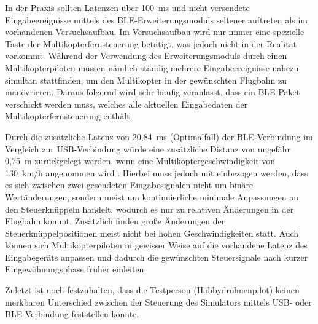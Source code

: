 In der Praxis sollten Latenzen über 100~ms und nicht versendete Eingabeereignisse mittels des \ac{BLE}-Erweiterungsmoduls seltener auftreten als im vorhandenen Versuchsaufbau. Im Versuchsaufbau wird nur immer eine spezielle Taste der Multikopterfernsteuerung betätigt, was jedoch nicht in der Realität vorkommt. Während der Verwendung des Erweiterungsmoduls durch einen Multikopterpiloten müssen nämlich ständig mehrere Eingabeereignisse nahezu simultan stattfinden, um den Multikopter in der gewünschten Flugbahn zu manövrieren. Daraus folgernd wird sehr häufig veranlasst, dass ein \ac{BLE}-Paket verschickt werden muss, welches alle aktuellen Eingabedaten der Multikopterfernsteuerung enthält.

Durch die zusätzliche Latenz von 20,84~ms (Optimalfall) der \ac{BLE}-Verbindung im Vergleich zur \acs{USB}-Verbindung würde eine zusätzliche Distanz von ungefähr 0,75~m zurückgelegt werden, wenn eine Multikoptergeschwindigkeit von 130~km/h angenommen wird \cites{droneSpeed1}{droneSpeed2}{droneSpeed3}. Hierbei muss jedoch mit einbezogen werden, dass es sich zwischen zwei gesendeten Eingabesignalen nicht um binäre Wertänderungen, sondern meist um kontinuierliche minimale Anpassungen an den Steuerknüppeln handelt, wodurch es nur zu relativen Änderungen in der Flugbahn kommt. Zusätzlich finden große Änderungen der Steuerknüppelpositionen meist nicht bei hohen Geschwindigkeiten statt. Auch können sich Multikopterpiloten in gewisser Weise auf die vorhandene Latenz des Eingabegeräts anpassen und dadurch die gewünschten Steuersignale nach kurzer Eingewöhnungsphase früher einleiten.

Zuletzt ist noch festzuhalten, dass die Testperson (Hobbydrohnenpilot) keinen merkbaren Unterschied zwischen der Steuerung des Simulators mittels \acs{USB}- oder \ac{BLE}-Verbindung feststellen konnte.